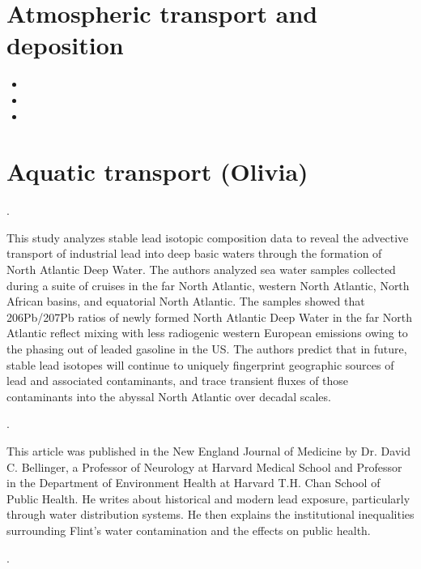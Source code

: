 \documentclass{article}
\begin{document}
\bigskip



\section{Atmospheric transport and deposition}
\begin{itemize}
  \item {}
  \item {}
  \item {}
\end{itemize}


\section{Aquatic transport (Olivia)}

\noindent {}.
\medskip

This study analyzes stable lead isotopic composition data to reveal the advective transport of industrial lead into deep basic waters through the formation of North Atlantic Deep Water. The authors analyzed sea water samples collected during a suite of cruises in the far North Atlantic, western North Atlantic, North African basins, and equatorial North Atlantic. The samples showed that 206Pb/207Pb ratios of newly formed North Atlantic Deep Water in the far North Atlantic reflect mixing with less radiogenic western European emissions owing to the phasing out of leaded gasoline in the US. The authors predict that in future, stable lead isotopes will continue to uniquely fingerprint geographic sources of lead and associated contaminants, and trace transient fluxes of those contaminants into the abyssal North Atlantic over decadal scales.

\medskip
\noindent {}.
\medskip

This article was published in the New England Journal of Medicine by Dr. David C. Bellinger, a Professor of Neurology at Harvard Medical School and Professor in the Department of Environment Health at Harvard T.H. Chan School of Public Health. He writes about historical and modern lead exposure, particularly through water distribution systems. He then explains the institutional inequalities surrounding Flint's water contamination and the effects on public health. 

\medskip
\noindent {}.
\medskip
\end{document}
